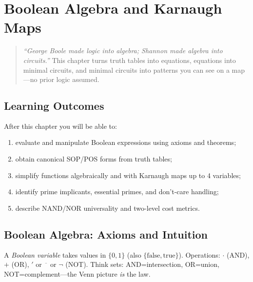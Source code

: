\chapter{Boolean Algebra and Karnaugh Maps}
\label{ch:boolean}

\begin{quote}
\emph{``George Boole made logic into algebra; Shannon made algebra into circuits.''}
This chapter turns truth tables into equations, equations into minimal circuits, and
minimal circuits into patterns you can see on a map---no prior logic assumed.
\end{quote}

\noindent{}
\vspace{0.4em}

\section*{Learning Outcomes}
After this chapter you will be able to:
\begin{enumerate}[label=(L\arabic*)]
    \item evaluate and manipulate Boolean expressions using axioms and theorems;
    \item obtain canonical SOP/POS forms from truth tables;
    \item simplify functions algebraically and with Karnaugh maps up to 4 variables;
    \item identify prime implicants, essential primes, and don't-care handling;
    \item describe NAND/NOR universality and two-level cost metrics.
\end{enumerate}

\section{Boolean Algebra: Axioms and Intuition}
\label{sec:boolean-axioms}
A \emph{Boolean variable} takes values in $\{0,1\}$ (also $\{\text{false},\text{true}\}$).
Operations: $\cdot$ (AND), $+$ (OR), $'$ or $\overline{\phantom{x}}$ or $\neg$ (NOT).
Think sets: AND=intersection, OR=union, NOT=complement---the Venn picture \emph{is} the law.

